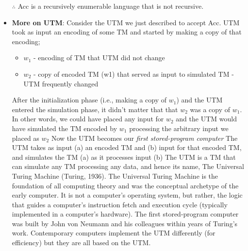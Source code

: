 \documentclass{report}
\begin{document}
\begin{itemize}
            \bigbreak \noindent 
            $\therefore$ Acc is a recursively enumerable language that is not recursive.
            \bigbreak \noindent 
        \item \textbf{More on UTM}: Consider the UTM we just described to accept Acc. UTM took as input an encoding of some TM and started by making a copy of that encoding;
            \begin{itemize}
                \item $w_{1}$ - encoding of TM that UTM did not change
                \item $w_{2}$ - copy of encoded TM (w1) that served as input to simulated TM - UTM frequently changed
            \end{itemize}
            \bigbreak \noindent 
            After the initialization phase (i.e., making a copy of $w_{1}$) and the UTM entered the simulation phase, it didn't matter that that $w_{2}$ was a copy of $w_{1}$.
            \bigbreak \noindent 
        In other words, we could have placed any input for $w_{2}$ and the UTM would have simulated the TM encoded by $w_{1}$ processing the arbitrary input we placed as $w_{2}$
        \bigbreak \noindent 
        Now the UTM becomes our \textit{first stored-program computer}
        \bigbreak \noindent 
        The UTM takes as input (a) an encoded TM and (b) input for that encoded TM, and simulates the TM (a) as it processes input (b)
        \bigbreak \noindent 
        The UTM is a TM that can simulate any TM processing any data, and hence its name, The Universal Turing Machine (Turing, 1936).
        \bigbreak \noindent 
        The Universal Turing Machine is the foundation of all computing theory and was the conceptual archetype of the early computer.
        \bigbreak \noindent 
        It is not a computer's operating system, but rather, the logic that guides a computer's instruction fetch and execution cycle (typically implemented in a computer's hardware).
        \bigbreak \noindent 
        The first stored-program computer was built by John von Neumann and his colleagues within years of Turing's work.
        \bigbreak \noindent 
        Contemporary computers implement the UTM differently (for efficiency) but they are all based on the UTM.
    \end{itemize}

    \pagebreak 
\end{document}
